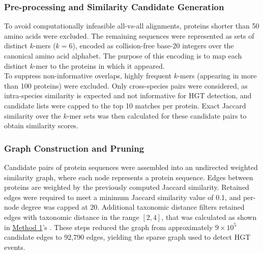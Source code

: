 \documentclass[11pt]{article}
\begin{document}
	\subsubsection{Pre-processing and Similarity Candidate Generation}
	To avoid computationally infeasible all-vs-all alignments, proteins shorter than 50 amino acids were excluded. The remaining sequences were represented as sets of distinct $k$-mers ($k=6$), encoded as collision-free base-20 integers over the canonical amino acid alphabet\cite{Sims2009,Haubold2014}. The purpose of this encoding is to map each distinct $k$-mer to the proteins in which it appeared.\\
	To suppress non-informative overlaps, highly frequent $k$-mers (appearing in more than 100 proteins) were excluded. Only cross-species pairs were considered, as intra-species similarity is expected and not informative for HGT detection, and candidate lists were capped to the top 10 matches per protein. Exact Jaccard similarity over the $k$-mer sets was then calculated for these candidate pairs to obtain similarity scores. 
	
	\subsubsection{Graph Construction and Pruning}
	Candidate pairs of protein sequences were assembled into an undirected weighted similarity graph, where each node represents a protein sequence. Edges between proteins are weighted by the previously computed Jaccard similarity. Retained edges were required to meet a minimum Jaccard similarity value of 0.1, and per-node degree was capped at 20. Additional taxonomic distance filters retained edges with taxonomic distance in the range $[2,4]$, that was calculated as shown in \hyperref[subsec:method1]{Method 1}'s . These steps reduced the graph from approximately $9\times 10^5$ candidate edges to 92,790 edges, yielding the sparse graph used to detect HGT events.
	
\end{document}
